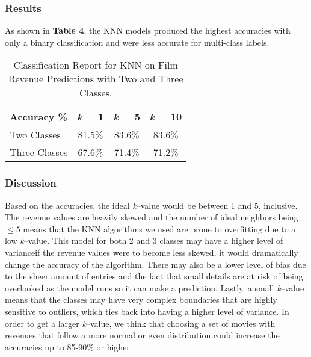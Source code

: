 \documentclass{article}
\begin{document}
\subsubsection{Results}
As shown in \textbf{Table 4}, the KNN models produced the highest accuracies with only a binary classification and were less accurate for multi-class labels.
\begin{table}[H]
    \centering
    \small %
    \caption{Classification Report for KNN on Film Revenue Predictions with Two and Three Classes.}
    \label{tab:classification_report_three_classes}
    \vspace{0.1in} %
    \begin{tabular}{lccc}
        \toprule
        \textbf{Accuracy \%} & \textbf{\textit{k} = 1} & \textbf{\textit{k} = 5} & \textbf{\textit{k} = 10} \\
        \midrule
        Two Classes  & 81.5\% & 83.6\% & 83.6\% \\
        Three Classes & 67.6\% & 71.4\% & 71.2\% \\
        \bottomrule
    \end{tabular}
    \vspace{0.1in} %
\end{table}


\subsubsection{Discussion}
Based on the accuracies, the ideal \textit{k}--value would be between 1 and 5, inclusive. The revenue values are heavily skewed and the number of ideal neighbors being $\leq 5$ means that the KNN algorithms we used are prone to overfitting due to a low \textit{k}--value. This model for both 2 and 3 classes may have a higher level of variance\textemdash if the revenue values were to become less skewed, it would dramatically change the accuracy of the algorithm. There may also be a lower level of bias due to the sheer amount of entries and the fact that small details are at risk of being overlooked as the model runs so it can make a prediction. Lastly, a small \textit{k}--value means that the classes may have very complex boundaries that are highly sensitive to outliers, which ties back into having a higher level of variance. In order to get a larger \textit{k}--value, we think that choosing a set of movies with revenues that follow a more normal or even distribution could increase the accuracies up to 85-90\% or higher.
\end{document}
